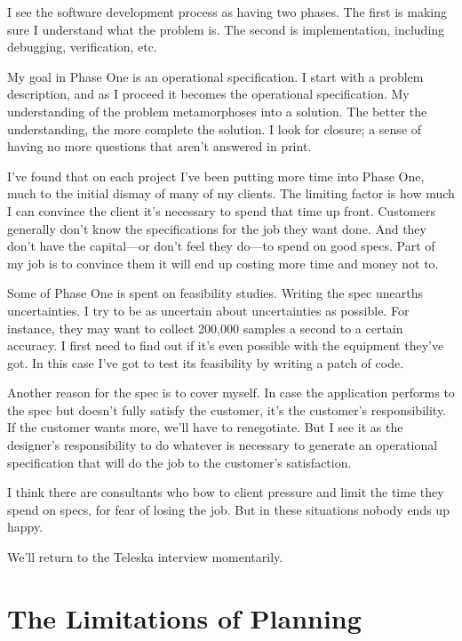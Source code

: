 \begin{tfquot}
I see the software development process as having two phases. The first is
making sure I understand what the problem is. The second is
implementation, including debugging, verification, etc.

My goal in Phase One is an operational specification. I start with a
problem description, and as I proceed it becomes the operational
specification. My understanding of the problem metamorphoses into a
solution. The better the understanding, the more complete the
solution. I look for closure; a sense of having no more questions that
aren't answered in print.

I've found that on each project I've been putting more time into Phase
One, much to the initial dismay of many of my clients. The limiting
factor is how
much I can convince the client it's necessary to spend that time up
front.  Customers generally don't know the specifications for the job
they want done. And they don't have the capital---or don't feel they
do---to spend on good specs. Part of my job is to convince them it
will end up costing more time and money not to.

Some of Phase One is spent on feasibility studies. Writing the spec
unearths uncertainties. I try to be as uncertain about uncertainties as
possible. For instance, they may want to collect 200,000 samples a second to a
certain accuracy. I first need to find out if it's even possible with the
equipment they've got. In this case I've got to test its feasibility by writing a
patch of code.

Another reason for the spec is to cover myself. In case the application
performs to the spec but doesn't fully satisfy the customer, it's the customer's
responsibility. If the customer wants more, we'll have to renegotiate. But I
see it as the designer's responsibility to do whatever is necessary to
generate an operational specification that will do the job to the customer's
satisfaction.

I think there are consultants who bow to client pressure and limit the time
they spend on specs, for fear of losing the job. But in these situations
nobody ends up happy.
\end{tfquot}
\blackline{2ex} %
We'll return to the Teleska interview momentarily.

\section{The Limitations of Planning}

